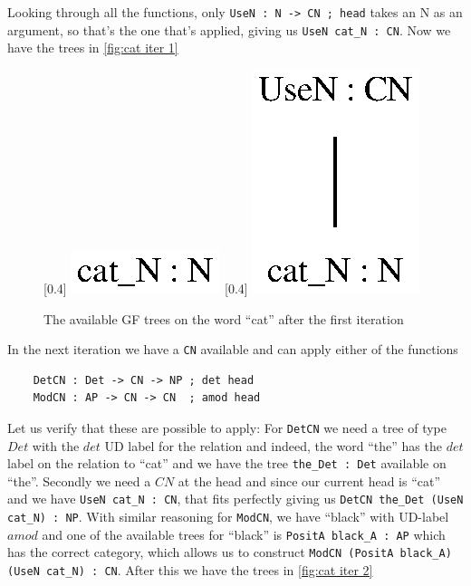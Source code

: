 Looking through all the functions, only \lstinline|UseN : N -> CN ; head| takes an N as an argument, so that's the one that's applied, giving us \lstinline|UseN cat_N : CN|. Now we have the trees in \autoref{fig:cat iter 1}

\begin{figure}[H]
    \centering
    [0.4\textwidth]
        {\includegraphics[scale=0.75]{thesis/figure/black_cats/cat_N_gf.eps}}
    [0.4\textwidth]
        {\includegraphics[scale=0.75]{thesis/figure/black_cats/cat_CN_gf.eps}}
    \caption{The available GF trees on the word ``cat'' after the first iteration}\label{fig:cat iter 1}
\end{figure}

In the next iteration we have a \lstinline|CN| available and can apply either of the functions
\begin{lstlisting}
    DetCN : Det -> CN -> NP ; det head
    ModCN : AP -> CN -> CN  ; amod head
\end{lstlisting}
Let us verify that these are possible to apply: For \lstinline|DetCN| we need a tree of type $Det$ with the $det$ UD label for the relation and indeed, the word ``the'' has the $det$ label on the relation to ``cat'' and we have the tree \lstinline|the_Det : Det| available on ``the''. Secondly we need a $CN$ at the head and since our current head is ``cat'' and we have \lstinline|UseN cat_N : CN|, that fits perfectly giving us \lstinline|DetCN the_Det (UseN cat_N) : NP|. With similar reasoning for \lstinline{ModCN}, we have ``black'' with UD-label $amod$ and one of the available trees for ``black'' is \lstinline|PositA black_A : AP| which has the correct category, which allows us to construct \lstinline|ModCN (PositA black_A) (UseN cat_N) : CN|. After this we have the trees in \autoref{fig:cat iter 2}

